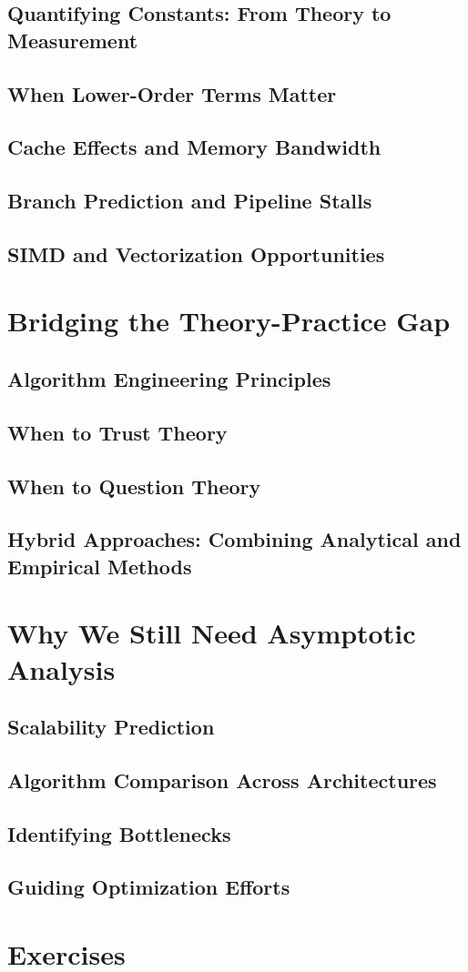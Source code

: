 \subsection{Quantifying Constants: From Theory to Measurement}
\subsection{When Lower-Order Terms Matter}
\subsection{Cache Effects and Memory Bandwidth}
\subsection{Branch Prediction and Pipeline Stalls}
\subsection{SIMD and Vectorization Opportunities}

\section{Bridging the Theory-Practice Gap}
\subsection{Algorithm Engineering Principles}
\subsection{When to Trust Theory}
\subsection{When to Question Theory}
\subsection{Hybrid Approaches: Combining Analytical and Empirical Methods}

\section{Why We Still Need Asymptotic Analysis}
\subsection{Scalability Prediction}
\subsection{Algorithm Comparison Across Architectures}
\subsection{Identifying Bottlenecks}
\subsection{Guiding Optimization Efforts}

\section{Exercises}